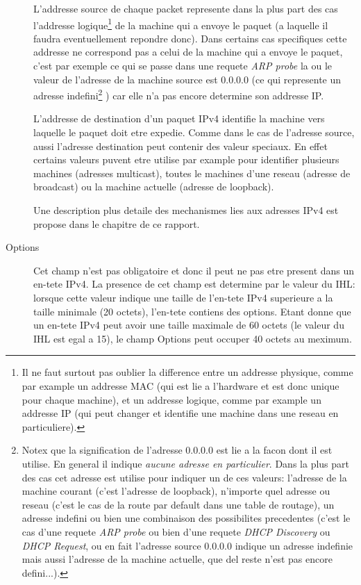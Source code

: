 \documentclass[twoside,openright,a4paper,11pt,french]{article}
\begin{document}
\begin{description}
L'addresse source de chaque packet represente dans la plus part des cas
l'addresse logique\footnote {Il ne faut surtout pas oublier la difference entre
un addresse physique, comme par example un addresse MAC (qui est lie a
l'hardware et est donc unique pour chaque machine), et un addresse logique,
comme par example un addresse IP (qui peut changer et identifie une machine
dans une reseau en particuliere).} de la machine qui a envoye le paquet
(a laquelle il faudra eventuellement repondre donc).  Dans certains cas
specifiques cette addresse ne correspond pas a celui de la machine qui a envoye
le paquet, c'est par exemple ce qui se passe dans une requete {\it ARP probe}
la ou le valeur de l'adresse de la machine source est 0.0.0.0 (ce qui represente
un adresse indefini\footnote {Notex que la signification de l'adresse 0.0.0.0
est lie a la facon dont il est utilise. En general il indique {\it aucune
adresse en particulier}.  Dans la plus part des cas cet adresse est utilise
pour indiquer un de ces valeurs: l'adresse de la machine courant (c'est
l'adresse de loopback), n'importe quel adresse ou reseau (c'est le cas de la
route par default dans une table de routage), un adresse indefini ou bien une
combinaison des possibilites precedentes (c'est le cas d'une requete {\it ARP
probe} ou bien d'une requete {\it DHCP Discovery} ou {\it DHCP Request}, ou en
fait l'adresse source 0.0.0.0 indique un adresse indefinie mais aussi l'adresse
de la machine actuelle, que del reste n'est pas encore defini...).}
) car elle n'a pas encore determine son addresse IP. 

L'addresse de destination d'un paquet IPv4 identifie la machine vers
laquelle le paquet doit etre expedie. Comme dans le cas de l'adresse source,
aussi l'adresse destination peut contenir des valeur speciaux. En effet certains 
valeurs puvent etre utilise par example pour identifier plusieurs machines
(adresses multicast), toutes le machines d'une reseau (adresse de broadcast) ou
la machine actuelle (adresse de loopback).

Une description plus detaile des mechanismes lies aux adresses IPv4 est
propose dans le chapitre 
de ce rapport.


\item [Options] 
Cet champ n'est pas obligatoire et donc il peut ne pas etre present dans un
en-tete IPv4. La presence de cet champ est determine par le valeur du
IHL: lorsque cette valeur indique une taille de l'en-tete IPv4 superieure a 
la taille minimale (20 octets), l'en-tete contiens des options.
Etant donne que un en-tete IPv4 peut avoir une taille maximale de 
60 octets (le valeur du IHL est egal a 15), le champ Options peut occuper
40 octets au meximum.


\end{description}
\end{document}
